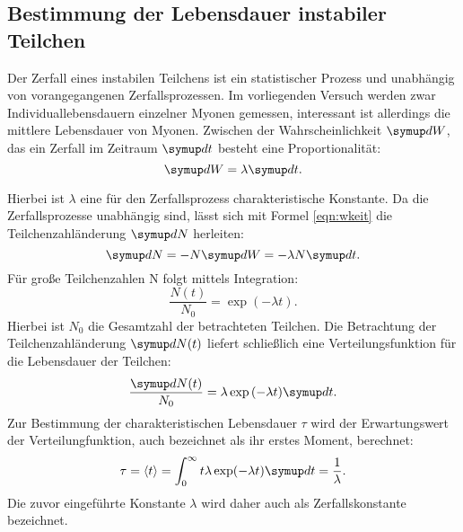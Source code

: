 \subsection{Bestimmung der Lebensdauer instabiler Teilchen}
Der Zerfall eines instabilen Teilchens ist ein statistischer Prozess und unabhängig von vorangegangenen Zerfallsprozessen.
Im vorliegenden Versuch werden zwar Individuallebensdauern einzelner Myonen gemessen, interessant ist allerdings die mittlere Lebensdauer von Myonen.
Zwischen der Wahrscheinlichkeit $\upd W$, das ein Zerfall im Zeitraum $\upd t$ besteht eine Proportionalität:
\begin{equation}
  \label{eqn:wkeit}
  \upd W=\lambda\upd t\mathrm{.}
\end{equation}

Hierbei ist $\lambda$ eine für den Zerfallsprozess charakteristische Konstante.
Da die Zerfallsprozesse unabhängig sind, lässt sich mit Formel \ref{eqn:wkeit} die Teilchenzahländerung $\upd N$ herleiten:
\begin{equation*}
\upd N = -N \upd W = - \lambda N \upd t  \mathrm{.}
\end{equation*}
Für große Teilchenzahlen N folgt mittels Integration:
\begin{equation}
\frac{N(t)}{N_0} = \exp{(-\lambda t)}\mathrm{.}
\end{equation}
Hierbei ist $N_0$ die Gesamtzahl der betrachteten Teilchen.
Die Betrachtung der Teilchenzahländerung $\upd N(t)$ liefert schließlich eine Verteilungsfunktion für die Lebensdauer der Teilchen:
\begin{equation}
  \label{eqn:verteilung}
  \frac{\upd N(t)}{N_0} = \lambda \exp{(-\lambda t)}\upd t\mathrm{.}
\end{equation}
Zur Bestimmung der charakteristischen Lebensdauer $\tau$ wird der Erwartungswert der Verteilungfunktion, auch bezeichnet als ihr erstes Moment, berechnet:
\begin{equation}
  \tau=\Braket{t}=\int_0^\infty t\lambda\exp(-\lambda t)\upd t=\frac{1}{\lambda}\mathrm{.}
\end{equation}
Die zuvor eingeführte Konstante $\lambda$ wird daher auch als Zerfallskonstante bezeichnet.

